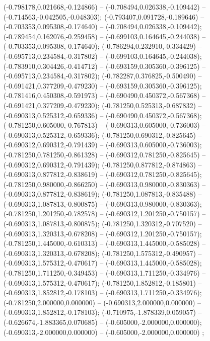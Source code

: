  (-0.798178,0.021668,-0.124866) -- (-0.708494,0.026338,-0.109442) -- (-0.714563,-0.042505,-0.048303);
 (-0.793407,0.091728,-0.189646) -- (-0.703353,0.095308,-0.174640) -- (-0.708494,0.026338,-0.109442);
 (-0.789454,0.162076,-0.259458) -- (-0.699103,0.164645,-0.244038) -- (-0.703353,0.095308,-0.174640);
 (-0.786294,0.232910,-0.334429) -- (-0.695713,0.234584,-0.317802) -- (-0.699103,0.164645,-0.244038);
 (-0.783910,0.304426,-0.414712) -- (-0.693159,0.305360,-0.396125) -- (-0.695713,0.234584,-0.317802);
 (-0.782287,0.376825,-0.500490) -- (-0.691421,0.377209,-0.479230) -- (-0.693159,0.305360,-0.396125);
 (-0.781416,0.450308,-0.591973) -- (-0.690490,0.450372,-0.567368) -- (-0.691421,0.377209,-0.479230);
 (-0.781250,0.525313,-0.687832) -- (-0.690313,0.525312,-0.659336) -- (-0.690490,0.450372,-0.567368);
 (-0.781250,0.605000,-0.767813) -- (-0.690313,0.605000,-0.736003) -- (-0.690313,0.525312,-0.659336);
 (-0.781250,0.690312,-0.825645) -- (-0.690312,0.690312,-0.791439) -- (-0.690313,0.605000,-0.736003);
 (-0.781250,0.781250,-0.861328) -- (-0.690312,0.781250,-0.825645) -- (-0.690312,0.690312,-0.791439);
 (-0.781250,0.877812,-0.874863) -- (-0.690313,0.877812,-0.838619) -- (-0.690312,0.781250,-0.825645);
 (-0.781250,0.980000,-0.866250) -- (-0.690313,0.980000,-0.830363) -- (-0.690313,0.877812,-0.838619);
 (-0.781250,1.087813,-0.835488) -- (-0.690313,1.087813,-0.800875) -- (-0.690313,0.980000,-0.830363);
 (-0.781250,1.201250,-0.782578) -- (-0.690312,1.201250,-0.750157) -- (-0.690313,1.087813,-0.800875);
 (-0.781250,1.320312,-0.707520) -- (-0.690313,1.320313,-0.678208) -- (-0.690312,1.201250,-0.750157);
 (-0.781250,1.445000,-0.610313) -- (-0.690313,1.445000,-0.585028) -- (-0.690313,1.320313,-0.678208);
 (-0.781250,1.575312,-0.490957) -- (-0.690313,1.575312,-0.470617) -- (-0.690313,1.445000,-0.585028);
 (-0.781250,1.711250,-0.349453) -- (-0.690313,1.711250,-0.334976) -- (-0.690313,1.575312,-0.470617);
 (-0.781250,1.852812,-0.185801) -- (-0.690313,1.852812,-0.178103) -- (-0.690313,1.711250,-0.334976);
 (-0.781250,2.000000,0.000000) -- (-0.690313,2.000000,0.000000) -- (-0.690313,1.852812,-0.178103);
 (-0.710975,-1.878339,0.059057) -- (-0.626674,-1.883365,0.070685) -- (-0.605000,-2.000000,0.000000);
 (-0.690313,-2.000000,0.000000) -- (-0.605000,-2.000000,0.000000) ;
